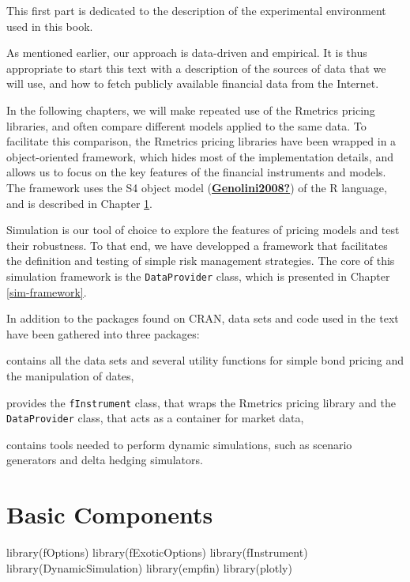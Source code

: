 \documentclass[justified]{tufte-book}
\newenvironment{Shaded}{}{}
\newcommand{\FunctionTok}[1]{\textcolor[rgb]{0.02,0.16,0.49}{#1}}
\newcommand{\NormalTok}[1]{#1}
\providecommand{\tightlist}{%
  \setlength{\itemsep}{0pt}\setlength{\parskip}{0pt}}
\newcommand{\class}[1]{\texttt{#1}}
\begin{document}
This first part is dedicated to the description of the experimental
environment used in this book.

As mentioned earlier, our approach is data-driven and empirical. It is
thus appropriate to start this text with a description of the sources of
data that we will use, and how to fetch publicly available financial
data from the Internet.

In the following chapters, we will make repeated use of the Rmetrics
pricing libraries, and often compare different models applied to the
same data. To facilitate this comparison, the Rmetrics pricing libraries
have been wrapped in a object-oriented framework, which hides most of
the implementation details, and allows us to focus on the key features
of the financial instruments and models. The framework uses the S4
object model (\protect\hyperlink{ref-Genolini2008}{\textbf{Genolini2008?}}) of the R language, and is described in
Chapter \ref{basic-components}.

Simulation is our tool of choice to explore the features of pricing
models and test their robustness. To that end, we have developped a
framework that facilitates the definition and testing of simple risk
management strategies. The core of this simulation framework is the \class{DataProvider}
class, which is presented in Chapter \ref{sim-framework}.

In addition to the packages found on CRAN, data sets and code used in the
text have been gathered into three packages:

\begin{description}
\tightlist
\item[empfin]
contains all the data sets and several utility functions for simple bond pricing and the manipulation of dates,
\item[fInstrument]
provides the \class{fInstrument} class, that wraps the Rmetrics pricing library and the \class{DataProvider} class, that acts as a container for market data,
\item[DynamicSimulation]
contains tools needed to perform dynamic simulations, such as scenario generators and delta hedging simulators.
\end{description}

\hypertarget{basic-components}{%
\chapter{Basic Components}\label{basic-components}}

\begin{Shaded}
\begin{Highlighting}[]
\FunctionTok{library}\NormalTok{(fOptions)}
\FunctionTok{library}\NormalTok{(fExoticOptions)}
\FunctionTok{library}\NormalTok{(fInstrument)}
\FunctionTok{library}\NormalTok{(DynamicSimulation)}
\FunctionTok{library}\NormalTok{(empfin)}
\FunctionTok{library}\NormalTok{(plotly)}
\end{Highlighting}
\end{Shaded}
\end{document}
